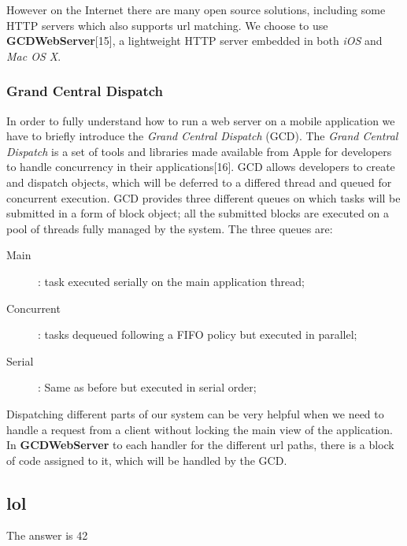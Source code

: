 However on the Internet there are many open source solutions, including some HTTP
servers which also supports url matching. We choose to use \textbf{GCDWebServer}[15], a lightweight
HTTP server embedded in both \textit{iOS} and \textit{Mac OS X}.

\subsubsection{Grand Central Dispatch}

In order to fully understand how to run a web server on a mobile application we
have to briefly introduce the \textit{Grand Central Dispatch} (GCD).
The \textit{Grand Central Dispatch} is a set of tools and libraries made available from
Apple for developers to handle concurrency in their applications[16]. GCD allows
developers to create and dispatch objects, which will be deferred to a differed thread
and queued for concurrent execution.\newline
GCD provides three different queues on which tasks will be submitted in a form of block object;
all the submitted blocks are executed on a pool of threads fully managed by the system. The three
queues are:\pagebreak

\begin{description}
    \item[Main]: task executed serially on the main application thread;
    \item[Concurrent]: tasks dequeued following a FIFO policy but executed in parallel;
    \item[Serial]: Same as before but executed in serial order;
\end{description}

Dispatching different parts of our system can be very helpful when we need to handle
a request from a client without locking the main view of the application. In \textbf{GCDWebServer}
to each handler for the different url paths, there is a block of code assigned to it,
which will be handled by the GCD.
















\subsection{lol}
The answer is 42
